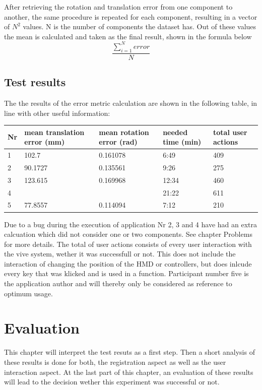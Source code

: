 \documentclass[hyperref,english,bachelorofscience,bibnum]{cgvpub}
\begin{document}
After retrieving the rotation and translation error from one component to another, the same procedure is repeated for each component, resulting in a vector of $N^2$ values. N is the number of components the dataset has. Out of these values the mean is calculated and taken as the final result, shown in the formula below
\[
\frac{\sum_{i=1}^{N}error}{N}
\]

\section{Test results}

The the results of the error metric calculation are shown in the following table, in line with other useful information:

\begin{table}[!h]
\begin{tabular}{|l|l|l|l|l|} \hline
Nr & mean translation error (mm) & mean rotation error (rad) & needed time (min) & total user actions \\ \hline
1 & 102.7 & 0.161078 & 6:49 & 409 \\
2 & 90.1727 & 0.135561 & 9:26 & 275 \\
3 & 123.615 & 0.169968 & 12:34 & 460 \\
4 &  &  & 21:22 & 611 \\
5 & 77.8557 & 0.114094 & 7:12 & 210 \\ \hline
\end{tabular}
\end{table}

Due to a bug during the execution of application Nr 2, 3 and 4 have had an extra calcuation which did not consider one or two components. See chapter Problems for more details.
The total of user actions consists of every user interaction with the vive system, wether it was successfull or not. This does not include the interaction of changing the position of the HMD or controllers, but does inlcude every key that was klicked and is used in a function.
Participant number five is the application author and will thereby only be considered as reference to optimum usage.

\chapter{Evaluation}

This chapter will interpret the test resuts as a first step. Then a short analysis of these results is done for both, the registration aspect as well as the user interaction aspect. At the last part of this chapter, an evaluation of these results will lead to the decision wether this experiment was successful or not.
\end{document}
